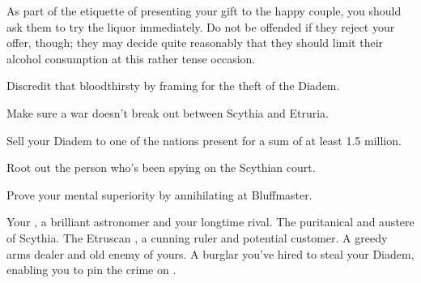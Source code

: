 \documentclass[char]{Kos}
\begin{document}
\begin{itemz}[Notes]
  \item As part of the etiquette of presenting your gift to the happy couple, you should ask them to try the liquor immediately. Do not be offended if they reject your offer, though; they may decide quite reasonably that they should limit their alcohol consumption at this rather tense occasion.
\end{itemz}


\begin{itemz}[Goals]
\item Discredit that bloodthirsty \cArmsDealer{\InsultThree} \cArmsDealer{} by framing \cArmsDealer{\them} for the theft of the Diadem.
\item Make sure a war doesn't break out between Scythia and Etruria.
\item Sell your Diadem to one of the nations present for a sum of at least 1.5 million.
\item Root out the person who's been spying on the Scythian court.
\item Prove your mental superiority by annihilating \cArmsDealer{} at Bluffmaster.
\end{itemz}

\begin{contacts}
\contact{\cAnarchist{}} Your \cAnarchist{\sibling}, a brilliant astronomer and your longtime rival.
\contact{\cScythiaQueen{}} The puritanical and austere \cScythiaQueen{\monarch} of Scythia.
\contact{\cEtruriaKing{}} The Etruscan \cEtruriaKing{\monarch}, a cunning ruler and potential customer.
\contact{\cArmsDealer{}} A greedy arms dealer and old enemy of yours.
\contact{\cBurglar{}} A burglar you've hired to steal your Diadem, enabling you to pin the crime on \cArmsDealer{}.
\end{contacts}
\end{document}
